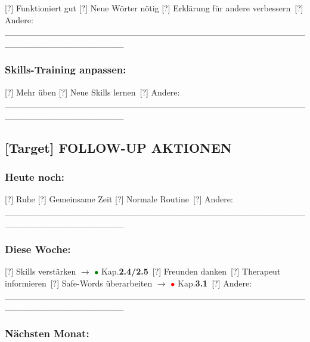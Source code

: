 [?] Funktioniert gut [?] Neue Wörter nötig [?] Erklärung für andere verbessern\
[?] Andere: \_\_\_\_\_\_\_\_\_\_\_\_\_\_\_\_\_\_\_\_\_\_\_\_\_\_\_\_\_\_\_\_\_\_\_\_\_\_\_\_\_\_\_\_\_\_\_\_\_\_\_\_\_\_\_\_\_\_\_\_\_\_\_\_\_\_\_

\hypertarget{skills-training-anpassen}{%
\subsubsection{\texorpdfstring{\textbf{Skills-Training anpassen:}}{Skills-Training anpassen:}}\label{skills-training-anpassen}}

[?] Mehr üben [?] Neue Skills lernen\
[?] Andere: \_\_\_\_\_\_\_\_\_\_\_\_\_\_\_\_\_\_\_\_\_\_\_\_\_\_\_\_\_\_\_\_\_\_\_\_\_\_\_\_\_\_\_\_\_\_\_\_\_\_\_\_\_\_\_\_\_\_\_\_\_\_\_\_\_\_\_

\hypertarget{follow-up-aktionen}{%
\subsection{\texorpdfstring{\textbf{[Target] FOLLOW-UP AKTIONEN}}{[Target] FOLLOW-UP AKTIONEN}}\label{follow-up-aktionen}}

\hypertarget{heute-noch}{%
\subsubsection{\texorpdfstring{\textbf{Heute noch:}}{Heute noch:}}\label{heute-noch}}

[?] Ruhe [?] Gemeinsame Zeit [?] Normale Routine\
[?] Andere: \_\_\_\_\_\_\_\_\_\_\_\_\_\_\_\_\_\_\_\_\_\_\_\_\_\_\_\_\_\_\_\_\_\_\_\_\_\_\_\_\_\_\_\_\_\_\_\_\_\_\_\_\_\_\_\_\_\_\_\_\_\_\_\_\_\_\_

\hypertarget{diese-woche}{%
\subsubsection{\texorpdfstring{\textbf{Diese Woche:}}{Diese Woche:}}\label{diese-woche}}

[?] Skills verstärken $\rightarrow$ \textcolor{green}{$\bullet$} Kap.\textbf{2.4/2.5}\
[?] Freunden danken\
[?] Therapeut informieren\
[?] Safe-Words überarbeiten $\rightarrow$ \textcolor{red}{$\bullet$} Kap.\textbf{3.1}\
[?] Andere: \_\_\_\_\_\_\_\_\_\_\_\_\_\_\_\_\_\_\_\_\_\_\_\_\_\_\_\_\_\_\_\_\_\_\_\_\_\_\_\_\_\_\_\_\_\_\_\_\_\_\_\_\_\_\_\_\_\_\_\_\_\_\_\_\_\_\_

\hypertarget{nuxe4chsten-monat}{%
\subsubsection{\texorpdfstring{\textbf{Nächsten Monat:}}{Nächsten Monat:}}\label{nuxe4chsten-monat}}

